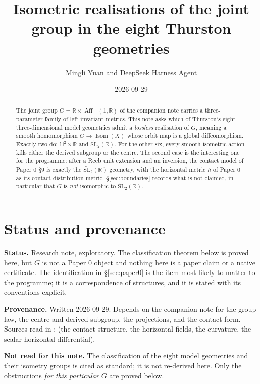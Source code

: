 \documentclass[11pt]{article}
\title{Isometric realisations of the joint group in the eight Thurston geometries}
\author{Mingli Yuan and DeepSeek Harness Agent}
\date{2026-09-29}
\begin{document}
\maketitle

\begin{abstract}
The joint group $G=\mathbb R\times\operatorname{Aff}^+(1,\mathbb R)$ of the
companion note carries a three-parameter family of left-invariant metrics. This
note asks which of Thurston's eight three-dimensional model geometries admit a
\emph{lossless} realisation of $G$, meaning a smooth homomorphism
$G\to\operatorname{Isom}(X)$ whose orbit map is a global diffeomorphism. Exactly
two do: $\mathbb H^2\times\mathbb R$ and $\widetilde{\mathrm{SL}}_2(\mathbb R)$.
For the other six, every smooth isometric action kills either the derived
subgroup or the centre. The second case is the interesting one for the programme:
after a Reeb unit extension and an inversion, the contact model of Paper 0 §9 is
exactly the $\widetilde{\mathrm{SL}}_2(\mathbb R)$ geometry, with the horizontal
metric $h$ of Paper 0 as its contact distribution metric. \S\ref{sec:boundaries}
records what is not claimed, in particular that $G$ is \emph{not} isomorphic to
$\widetilde{\mathrm{SL}}_2(\mathbb R)$.
\end{abstract}

\tableofcontents

\section{Status and provenance}
\label{sec:status}

\textbf{Status.} Research note, exploratory. The classification theorem below is
proved here, but $G$ is not a Paper 0 object and nothing here is a paper claim or
a native certificate. The identification in \S\ref{sec:paper0} is the item most
likely to matter to the programme; it is a correspondence of structures, and it
is stated with its conventions explicit.

\textbf{Provenance.} Written 2026-09-29. Depends on the companion note
for the group law, the centre and derived subgroup, the projections, and the
contact form. Sources read in : 
(the contact structure, the horizontal fields, the curvature, the scalar
horizontal differential).

\textbf{Not read for this note.} The classification of the eight model
geometries and their isometry groups is cited as standard; it is not re-derived
here. Only the obstructions \emph{for this particular $G$} are proved below.
\end{document}

